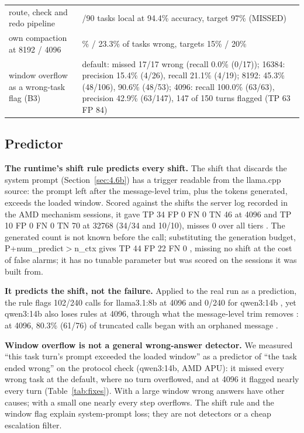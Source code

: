 \documentclass[conference,10pt]{IEEEtran}
\begin{document}
\begin{table}[t]
\begin{tabular}{@{}>{\raggedright\arraybackslash}p{}>{\raggedright\arraybackslash}p{}@{}}
route, check and redo pipeline & 81/90 tasks local at 94.4\% accuracy, target 97\% (MISSED)  \\
own compaction at 8192 / 4096 & 16.0\% / 23.3\% of tasks wrong, targets 15\% / 20\%  \\
window overflow as a wrong-task flag (B3) & default: missed 17/17 wrong (recall 0.0\% (0/17)); 16384: precision 15.4\% (4/26), recall 21.1\% (4/19); 8192: 45.3\% (48/106), 90.6\% (48/53); 4096: recall 100.0\% (63/63), precision 42.9\% (63/147), 147 of 150 turns flagged (TP 63 FP 84)  \\
\bottomrule
\end{tabular}
\end{table}

\subsection{Predictor}\label{sec:4.7p}

\textbf{The runtime's shift rule predicts every shift.} The shift that discards the system prompt (Section~\ref{sec:4.6b}) has a trigger readable from the llama.cpp source: the prompt left after the message-level trim, plus the tokens generated, exceeds the loaded window. Scored against the shifts the server log recorded in the AMD mechanism sessions, it gave TP 34 FP 0 FN 0 TN 46 at 4096 and TP 10 FP 0 FN 0 TN 70 at 32768 (34/34 and 10/10), misses 0 over all tiers%
. The generated count is not known before the call; substituting the generation budget, P+num\_predict$>$n\_ctx gives TP 44 FP 22 FN 0%
, missing no shift at the cost of false alarms; it has no tunable parameter but was scored on the sessions it was built from.

\textbf{It predicts the shift, not the failure.} Applied to the real run as a prediction, the rule flags 102/240 calls for llama3.1:8b at 4096 and 0/240 for qwen3:14b%
, yet qwen3:14b also loses rules at 4096, through what the message-level trim removes%
: at 4096, 80.3\% (61/76) of truncated calls began with an orphaned message%
.

\textbf{Window overflow is not a general wrong-answer detector.} We measured ``this task turn's prompt exceeded the loaded window'' as a predictor of ``the task ended wrong'' on the protocol check (qwen3:14b, AMD APU): it missed every wrong task at the default, where no turn overflowed, and at 4096 it flagged nearly every turn %
(Table~\ref{tab:fixes}). With a large window wrong answers have other causes; with a small one nearly every step overflows. The shift rule and the window flag explain system-prompt loss; they are not detectors or a cheap escalation filter.
\end{document}
